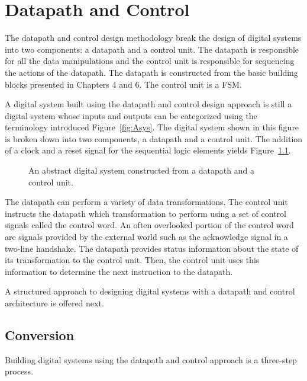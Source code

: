 \chapter{Datapath and Control}
The datapath and control design methodology break the design
of digital systems into two components: a datapath and a control 
unit.  The datapath is responsible for all the data manipulations
and the control unit is responsible for sequencing the
actions of the datapath.  The datapath is constructed from the basic 
building blocks presented in Chapters 4 and 6.  The control unit is
a FSM.  

A digital system built using the datapath and control design approach
is still a digital system whose inputs and outputs can be categorized
using the terminology introduced Figure~\ref{fig:Asys}.  The 
digital system shown in this figure is broken down into two components,
a datapath and a control unit.  The addition of a clock and a reset signal for the 
sequential logic elements yields Figure~\ref{fig:Abstract}.

\begin{figure}[ht]
\caption{An abstract digital system constructed from a datapath and
a control unit.}
\label{fig:Abstract}
\end{figure}
\label{page:Abstract}

The datapath can perform a variety of data transformations.  The control 
unit instructs the datapath which transformation to perform using a set 
of control signals called the control word.  An often overlooked portion 
of the control word are signals provided by the external world such as
the acknowledge signal in a two-line handshake.  The datapath 
provides status information about the state of its transformation to the 
control unit.  Then, the control unit uses this information to determine 
the next instruction to the datapath.

A structured approach to designing digital systems with a
datapath and control architecture is offered next.

\section{Conversion}
Building digital systems using the datapath and control approach is a
three-step process.

